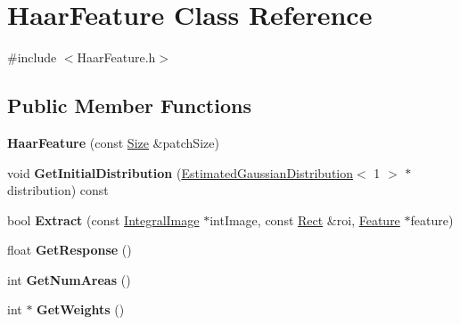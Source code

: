 \hypertarget{classHaarFeature}{}\section{Haar\+Feature Class Reference}
\label{classHaarFeature}


{\ttfamily \#include $<$Haar\+Feature.\+h$>$}

\subsection*{Public Member Functions}
\begin{DoxyCompactItemize}
\item 
\hypertarget{classHaarFeature_a54b1a86c01341793d393cce0e8ff7d72}{}{\bfseries Haar\+Feature} (const \hyperlink{classSize}{Size} \&patch\+Size)\label{classHaarFeature_a54b1a86c01341793d393cce0e8ff7d72}

\item 
\hypertarget{classHaarFeature_a293df81066b1cba52baac9904e155b20}{}void {\bfseries Get\+Initial\+Distribution} (\hyperlink{classEstimatedGaussianDistribution}{Estimated\+Gaussian\+Distribution}$<$ 1 $>$ $\ast$distribution) const \label{classHaarFeature_a293df81066b1cba52baac9904e155b20}

\item 
\hypertarget{classHaarFeature_a9b74485ba82429c7311a0aa490a2f1b6}{}bool {\bfseries Extract} (const \hyperlink{classIntegralImage}{Integral\+Image} $\ast$int\+Image, const \hyperlink{classRect}{Rect} \&roi, \hyperlink{classFeature}{Feature} $\ast$feature)\label{classHaarFeature_a9b74485ba82429c7311a0aa490a2f1b6}

\item 
\hypertarget{classHaarFeature_a40d755bcccf0ea1e5ebb154eea7d26ac}{}float {\bfseries Get\+Response} ()\label{classHaarFeature_a40d755bcccf0ea1e5ebb154eea7d26ac}

\item 
\hypertarget{classHaarFeature_aa2abfada29f6848fef8d45c4c85479c1}{}int {\bfseries Get\+Num\+Areas} ()\label{classHaarFeature_aa2abfada29f6848fef8d45c4c85479c1}

\item 
\hypertarget{classHaarFeature_a25936c7b13e76190a58ae737de1de360}{}int $\ast$ {\bfseries Get\+Weights} ()\label{classHaarFeature_a25936c7b13e76190a58ae737de1de360}

\end{DoxyCompactItemize}


